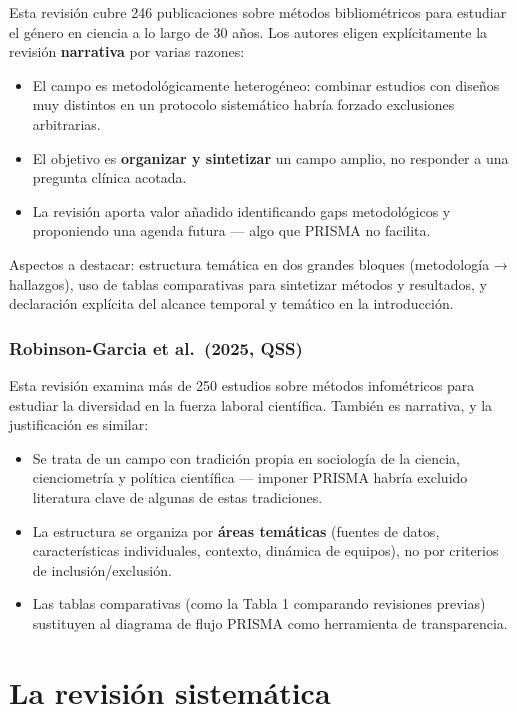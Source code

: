 \documentclass[
]{book}
\providecommand{\tightlist}{%
  \setlength{\itemsep}{0pt}\setlength{\parskip}{0pt}}
\begin{document}
Esta revisión cubre 246 publicaciones sobre métodos bibliométricos para estudiar el género en ciencia a lo largo de 30 años. Los autores eligen explícitamente la revisión \textbf{narrativa} por varias razones:

\begin{itemize}
\tightlist
\item
  El campo es metodológicamente heterogéneo: combinar estudios con diseños muy distintos en un protocolo sistemático habría forzado exclusiones arbitrarias.
\item
  El objetivo es \textbf{organizar y sintetizar} un campo amplio, no responder a una pregunta clínica acotada.
\item
  La revisión aporta valor añadido identificando gaps metodológicos y proponiendo una agenda futura --- algo que PRISMA no facilita.
\end{itemize}

Aspectos a destacar: estructura temática en dos grandes bloques (metodología → hallazgos), uso de tablas comparativas para sintetizar métodos y resultados, y declaración explícita del alcance temporal y temático en la introducción.

\subsection{Robinson-Garcia et al.~(2025, QSS)}\label{robinson-garcia-et-al.-2025-qss}

Esta revisión examina más de 250 estudios sobre métodos infométricos para estudiar la diversidad en la fuerza laboral científica. También es narrativa, y la justificación es similar:

\begin{itemize}
\tightlist
\item
  Se trata de un campo con tradición propia en sociología de la ciencia, cienciometría y política científica --- imponer PRISMA habría excluido literatura clave de algunas de estas tradiciones.
\item
  La estructura se organiza por \textbf{áreas temáticas} (fuentes de datos, características individuales, contexto, dinámica de equipos), no por criterios de inclusión/exclusión.
\item
  Las tablas comparativas (como la Tabla 1 comparando revisiones previas) sustituyen al diagrama de flujo PRISMA como herramienta de transparencia.
\end{itemize}

\chapter{La revisión sistemática}\label{la-revisiuxf3n-sistemuxe1tica}
\end{document}
